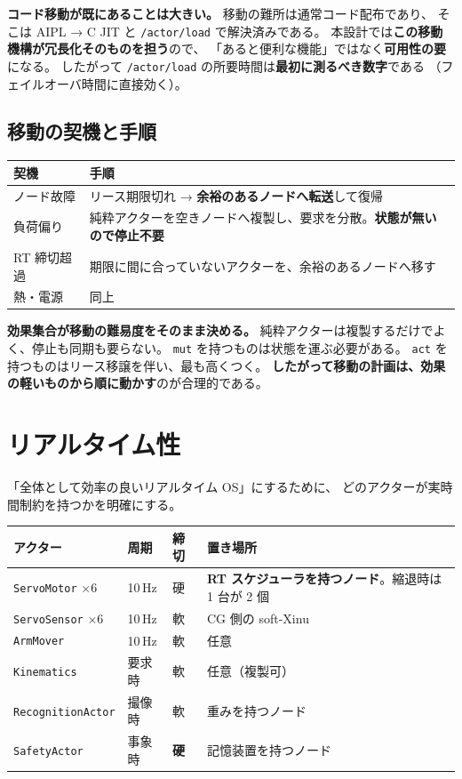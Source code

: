 \documentclass[11pt,a4paper]{article}
\newcommand{\code}[1]{\texttt{#1}}
\newcommand{\good}[1]{\textbf{\textcolor{green!45!black}{#1}}}
\begin{document}
\textbf{コード移動が既にあることは大きい。} 移動の難所は通常コード配布であり、
そこは AIPL → C JIT と \code{/actor/load} で解決済みである。
本設計では\good{この移動機構が冗長化そのものを担う}ので、
「あると便利な機能」ではなく\textbf{可用性の要}になる。
したがって \code{/actor/load} の所要時間は\textbf{最初に測るべき数字}である
（フェイルオーバ時間に直接効く）。

\subsection{移動の契機と手順}

\begin{center}\small
\begin{tabularx}{\textwidth}{@{}l X@{}}
\toprule
\textbf{契機} & \textbf{手順}\\
\midrule
ノード故障 & リース期限切れ → \textbf{余裕のあるノードへ転送}して復帰\\
負荷偏り & 純粋アクターを空きノードへ複製し、要求を分散。\textbf{状態が無いので停止不要}\\
RT 締切超過 & 期限に間に合っていないアクターを、余裕のあるノードへ移す\\
熱・電源 & 同上\\
\bottomrule
\end{tabularx}
\end{center}

\textbf{効果集合が移動の難易度をそのまま決める。}
純粋アクターは複製するだけでよく、停止も同期も要らない。
\code{mut} を持つものは状態を運ぶ必要がある。
\code{act} を持つものはリース移譲を伴い、最も高くつく。
\textbf{したがって移動の計画は、効果の軽いものから順に動かす}のが合理的である。

\section{リアルタイム性}\label{sec:rt}

「全体として効率の良いリアルタイム OS」にするために、
どのアクターが実時間制約を持つかを明確にする。

\begin{center}\small
\begin{tabularx}{\textwidth}{@{}l l l X@{}}
\toprule
\textbf{アクター} & \textbf{周期} & \textbf{締切} & \textbf{置き場所}\\
\midrule
\code{ServoMotor} $\times$6 & 10\,Hz & 硬 & \textbf{RT スケジューラを持つノード}。縮退時は 1 台が 2 個\\
\code{ServoSensor} $\times$6 & 10\,Hz & 軟 & CG 側の soft-Xinu\\
\code{ArmMover} & 10\,Hz & 軟 & 任意\\
\code{Kinematics} & 要求時 & 軟 & 任意（複製可）\\
\code{RecognitionActor} & 撮像時 & 軟 & 重みを持つノード\\
\code{SafetyActor} & 事象時 & \good{硬} & 記憶装置を持つノード\\
\bottomrule
\end{tabularx}
\end{center}
\end{document}
